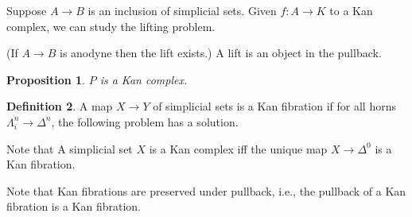 \documentclass{article}
\theoremstyle{definition}
\newtheorem{defn}{Definition}[section]
\theoremstyle{remark}
\theoremstyle{plain}
\newtheorem{prop}[defn]{Proposition}
\newcommand{\Hom}{\operatorname{Hom}}
\begin{document}
Suppose $A\to B$ is an inclusion of simplicial sets. Given $f:A\to K$ to a Kan complex, we can study the lifting problem.
\begin{center}
\end{center}
(If $A\to B$ is anodyne then the lift exists.) A lift is an object in the pullback.
\begin{center}
\end{center}
\begin{prop}
    $P$ is a Kan complex.
\end{prop}
\begin{defn}
    A map $X\to Y$ of simplicial sets is a Kan fibration if for all horns $\Lambda_i^n\to\Delta^n$, the following problem has a solution.
    \begin{center}
    \end{center}
\end{defn}
Note that A simplicial set $X$ is a Kan complex iff the unique map $X\to\Delta^0$ is a Kan fibration.

Note that Kan fibrations are preserved under pullback, i.e., the pullback of a Kan fibration is a Kan fibration.
\end{document}
